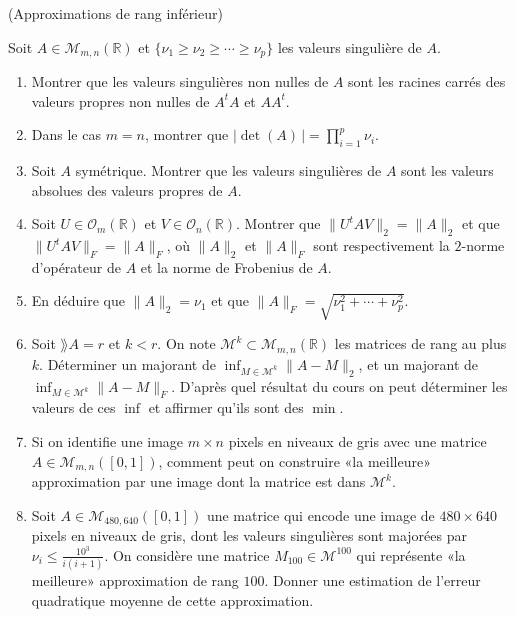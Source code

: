 \documentclass[a4paper,12pt,reqno]{amsart}
\begin{document}
\begin{exo} (Approximations de rang inférieur)

Soit $A \in \mathcal{M}_{m,n}(\mathbb{R})$ et $\{ \nu_{1} \geq \nu_{2} \geq \cdots \geq \nu_{p}\}$ les valeurs singulière de $A$.

    \begin{enumerate}

        \item Montrer que les valeurs singulières non nulles de $A$ sont les racines carrés des valeurs propres non nulles de $A^{t}A$ et $AA^{t}$.

        \item Dans le cas $m=n$, montrer que $ |\det(A)\,| = \prod_{i=1}^{p} \nu_{i}$.

        \item Soit $A$ symétrique. Montrer que les valeurs singulières de $A$ sont les valeurs absolues des valeurs propres de $A$.

        \item Soit $U \in \mathcal{O}_{m}(\mathbb{R})$ et $V \in \mathcal{O}_{n}(\mathbb{R})$. Montrer que $\| U^{t} A  V\|_{2} = \| A \|_{2}$ et que $\| U^{t} A  V\|_{F} = \| A \|_{F}$, où $\| A \|_{2}$ et $\| A \|_{F}$ sont respectivement la $2$-norme d'opérateur de $A$ et la norme de Frobenius de $A$.

        \item En déduire que $\| A \|_{2} = \nu_{1}$ et que $\| A \|_{F} = \sqrt{\nu_{1}^{2}+\cdots+\nu_{p}^{2}}$.

        \item Soit $\rang A = r$ et $k < r$. On note $\mathcal{M}^{k} \subset \mathcal{M}_{m,n}(\mathbb{R})$ les matrices de rang au plus $k$.  Déterminer un majorant de $\inf_{M \in \mathcal{M}^{k}}\| A - M\|_{2}$, et un majorant de $\inf_{M \in \mathcal{M}^{k}}\| A - M\|_{F}$. D'après quel résultat du cours on peut déterminer les valeurs de ces $\inf$ et affirmer qu'ils sont des $\min$.

        \item Si on identifie une image $m \times n$ pixels en niveaux de gris avec une matrice $A \in \mathcal{M}_{m,n}([0,1])$, comment peut on construire «la meilleure» approximation par une image dont la matrice est dans $\mathcal{M}^{k}$.

        \item Soit $A \in \mathcal{M}_{480,640}([0,1])$ une matrice qui encode une image de $480 \times 640$ pixels en niveaux de gris, dont les valeurs singulières sont majorées par $\nu_{i} \leq \frac{10^{3}}{i(i+1)}$. On considère une matrice $M_{100} \in \mathcal{M}^{100}$ qui représente «la meilleure» approximation de rang $100$. Donner une estimation de l'erreur quadratique moyenne de cette approximation.
    \end{enumerate}
\end{exo}
\end{document}

